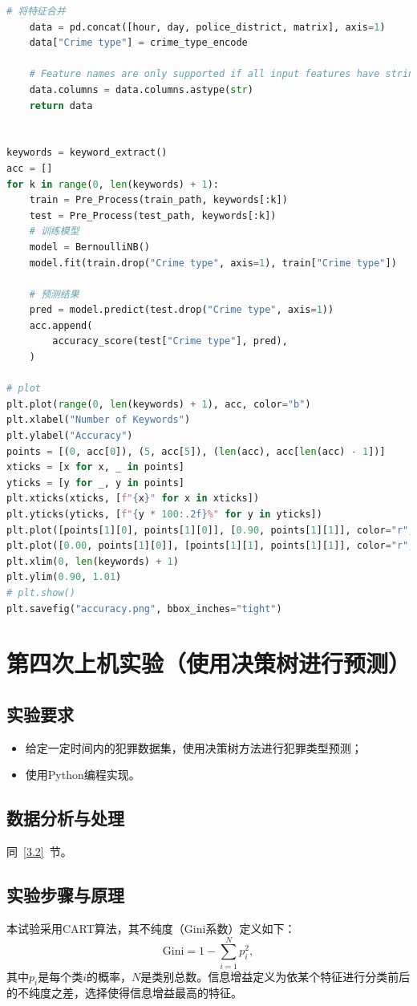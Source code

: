 \documentclass[a4paper,12pt]{report}
\begin{document}
\begin{lstlisting}[language=Python]
    # 将特征合并
    data = pd.concat([hour, day, police_district, matrix], axis=1)
    data["Crime type"] = crime_type_encode

    # Feature names are only supported if all input features have string names
    data.columns = data.columns.astype(str)
    return data


keywords = keyword_extract()
acc = []
for k in range(0, len(keywords) + 1):
    train = Pre_Process(train_path, keywords[:k])
    test = Pre_Process(test_path, keywords[:k])
    # 训练模型
    model = BernoulliNB()
    model.fit(train.drop("Crime type", axis=1), train["Crime type"])

    # 预测结果
    pred = model.predict(test.drop("Crime type", axis=1))
    acc.append(
        accuracy_score(test["Crime type"], pred),
    )

# plot
plt.plot(range(0, len(keywords) + 1), acc, color="b")
plt.xlabel("Number of Keywords")
plt.ylabel("Accuracy")
points = [(0, acc[0]), (5, acc[5]), (len(acc), acc[len(acc) - 1])]
xticks = [x for x, _ in points]
yticks = [y for _, y in points]
plt.xticks(xticks, [f"{x}" for x in xticks])
plt.yticks(yticks, [f"{y * 100:.2f}%" for y in yticks])
plt.plot([points[1][0], points[1][0]], [0.90, points[1][1]], color="r", linestyle="--")
plt.plot([0.00, points[1][0]], [points[1][1], points[1][1]], color="r", linestyle="--")
plt.xlim(0, len(keywords) + 1)
plt.ylim(0.90, 1.01)
# plt.show()
plt.savefig("accuracy.png", bbox_inches="tight")
\end{lstlisting}
\clearpage
\chapter{第四次上机实验（使用决策树进行预测）}
\section{实验要求}
\begin{itemize}
    \item 给定一定时间内的犯罪数据集，使用决策树方法进行犯罪类型预测；
    \item 使用Python编程实现。
\end{itemize}
\section{数据分析与处理}
\par 同~\ref{3.2}\ 节。
\section{实验步骤与原理}
\par 本试验采用CART算法，其不纯度（Gini系数）定义如下：
$$
\mathrm{Gini}=1-\sum_{i=1}^{N}p_{i}^{2},
$$
其中$p_{i}$是每个类$i$的概率，$N$是类别总数。信息增益定义为依某个特征进行分类前后的不纯度之差，选择使得信息增益最高的特征。
\end{document}
